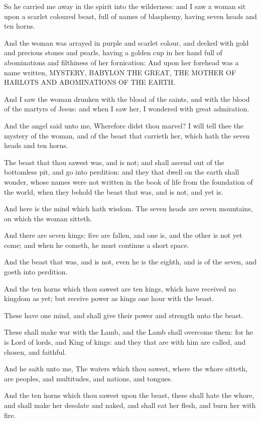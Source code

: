 \verse So he carried me away in the spirit into the wilderness: and I saw a woman sit upon a scarlet coloured beast, full of names of blasphemy, having seven heads and ten horns.

\verse And the woman was arrayed in purple and scarlet colour, and decked with gold and precious stones and pearls, having a golden cup in her hand full of abominations and filthiness of her fornication: \verse And upon her forehead was a name written, MYSTERY, BABYLON THE GREAT, THE MOTHER OF HARLOTS AND ABOMINATIONS OF THE EARTH.

\verse And I saw the woman drunken with the blood of the saints, and with the blood of the martyrs of Jesus: and when I saw her, I wondered with great admiration.

\verse And the angel said unto me, Wherefore didst thou marvel? I will tell thee the mystery of the woman, and of the beast that carrieth her, which hath the seven heads and ten horns.

\verse The beast that thou sawest was, and is not; and shall ascend out of the bottomless pit, and go into perdition: and they that dwell on the earth shall wonder, whose names were not written in the book of life from the foundation of the world, when they behold the beast that was, and is not, and yet is.

\verse And here is the mind which hath wisdom. The seven heads are seven mountains, on which the woman sitteth.

\verse And there are seven kings: five are fallen, and one is, and the other is not yet come; and when he cometh, he must continue a short space.

\verse And the beast that was, and is not, even he is the eighth, and is of the seven, and goeth into perdition.

\verse And the ten horns which thou sawest are ten kings, which have received no kingdom as yet; but receive power as kings one hour with the beast.

\verse These have one mind, and shall give their power and strength unto the beast.

\verse These shall make war with the Lamb, and the Lamb shall overcome them: for he is Lord of lords, and King of kings: and they that are with him are called, and chosen, and faithful.

\verse And he saith unto me, The waters which thou sawest, where the whore sitteth, are peoples, and multitudes, and nations, and tongues.

\verse And the ten horns which thou sawest upon the beast, these shall hate the whore, and shall make her desolate and naked, and shall eat her flesh, and burn her with fire.

